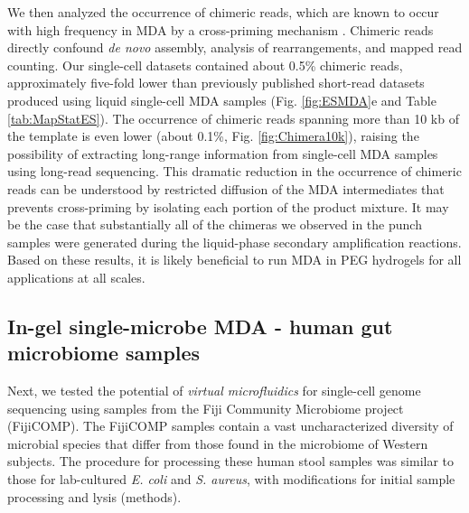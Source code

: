 We then analyzed the occurrence of chimeric reads, which are known to occur with high frequency in MDA by a cross-priming mechanism \cite{Lasken:2007db}. Chimeric reads directly confound \textit{de novo} assembly, analysis of rearrangements, and mapped read counting. Our single-cell datasets contained about 0.5\% chimeric reads, approximately five-fold lower than previously published short-read datasets produced using liquid single-cell MDA samples (Fig. \ref{fig:ESMDA}e and Table \ref{tab:MapStatES}). The occurrence of chimeric reads spanning more than 10 kb of the template is even lower (about 0.1\%, Fig. \ref{fig:Chimera10k}), raising the possibility of extracting long-range information from single-cell MDA samples using long-read sequencing. This dramatic reduction in the occurrence of chimeric reads can be understood by restricted diffusion of the MDA intermediates that prevents cross-priming by isolating each portion of the product mixture. It may be the case that substantially all of the chimeras we observed in the punch samples were generated during the liquid-phase secondary amplification reactions. Based on these results, it is likely beneficial to run MDA in PEG hydrogels for all applications at all scales. 

\subsection{In-gel single-microbe MDA - human gut microbiome samples}
Next, we tested the potential of \textit{virtual microfluidics} for single-cell genome sequencing using samples from the Fiji Community Microbiome project (FijiCOMP). The FijiCOMP samples contain a vast uncharacterized diversity of microbial species that differ from those found in the microbiome of Western subjects. The procedure for processing these human stool samples was similar to those for lab-cultured \textit{E. coli} and \textit{S. aureus}, with modifications for initial sample processing and lysis (methods).

